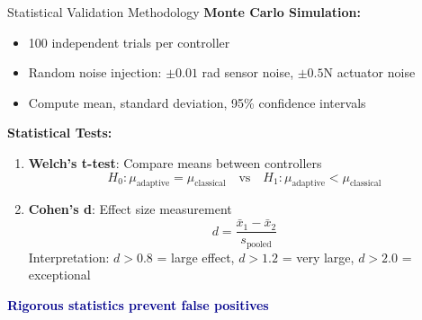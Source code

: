 \documentclass[10pt,aspectratio=169]{beamer}
\newcommand{\highlight}[1]{\textcolor{darkblue}{\textbf{#1}}}
\begin{document}
\begin{frame}{Statistical Validation Methodology}
\textbf{Monte Carlo Simulation:}
\begin{itemize}
    \item 100 independent trials per controller
    \item Random noise injection: $\pm 0.01$ rad sensor noise, $\pm 0.5$N actuator noise
    \item Compute mean, standard deviation, 95\% confidence intervals
\end{itemize}

\vspace{0.3cm}
\textbf{Statistical Tests:}
\begin{enumerate}
    \item \textbf{Welch's t-test}: Compare means between controllers
    \[
    H_0: \mu_{\text{adaptive}} = \mu_{\text{classical}} \quad \text{vs} \quad H_1: \mu_{\text{adaptive}} < \mu_{\text{classical}}
    \]
    \item \textbf{Cohen's d}: Effect size measurement
    \[
    d = \frac{\bar{x}_1 - \bar{x}_2}{s_{\text{pooled}}}
    \]
    Interpretation: $d > 0.8$ = large effect, $d > 1.2$ = very large, $d > 2.0$ = exceptional
\end{enumerate}

\vspace{0.3cm}
\centering
\highlight{Rigorous statistics prevent false positives}
\end{frame}
\end{document}

